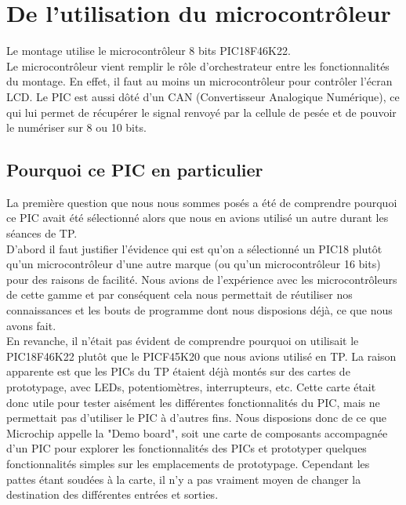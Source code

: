 \documentclass[a4paper,11pt,titlepage]{article}
\begin{document}
\section{De l'utilisation du microcontrôleur}

Le montage utilise le microcontrôleur 8 bits PIC18F46K22.\\

Le microcontrôleur vient remplir le rôle d'orchestrateur entre les fonctionnalités du montage. En effet, il faut au moins un microcontrôleur pour contrôler l'écran LCD. Le PIC est aussi dôté d'un CAN (Convertisseur Analogique Numérique), ce qui lui permet de récupérer le signal renvoyé par la cellule de pesée et de pouvoir le numériser sur 8 ou 10 bits.

\subsection{Pourquoi ce PIC en particulier}

La première question que nous nous sommes posés a été de comprendre pourquoi ce PIC avait été sélectionné alors que nous en avions utilisé un autre durant les séances de TP.\\

D'abord il faut justifier l'évidence qui est qu'on a sélectionné un PIC18 plutôt qu'un microcontrôleur d'une autre marque (ou qu'un microcontrôleur 16 bits) pour des raisons de facilité. Nous avions de l'expérience avec les microcontrôleurs de cette gamme et par conséquent cela nous permettait de réutiliser nos connaissances et les bouts de programme dont nous disposions déjà, ce que nous avons fait.\\

En revanche, il n'était pas évident de comprendre pourquoi on utilisait le PIC18F46K22 plutôt que le PICF45K20 que nous avions utilisé en TP. La raison apparente est que les PICs du TP étaient déjà montés sur des cartes de prototypage, avec LEDs, potentiomètres, interrupteurs, etc. Cette carte était donc utile pour tester aisément les différentes fonctionnalités du PIC, mais ne permettait pas d'utiliser le PIC à d'autres fins. Nous disposions donc de ce que Microchip appelle la "Demo board", soit une carte de composants accompagnée d'un PIC pour explorer les fonctionnalités des PICs et prototyper quelques fonctionnalités simples sur les emplacements de prototypage. Cependant les pattes étant soudées à la carte, il n'y a pas vraiment moyen de changer la destination des différentes entrées et sorties.\\
\end{document}
